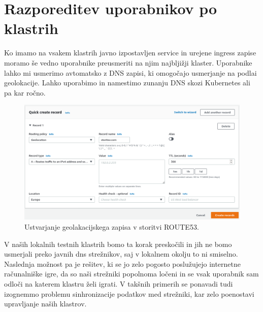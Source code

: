 \documentclass[a4paper, 12pt]{book}
\begin{document}
\section{Razporeditev uporabnikov po klastrih}
Ko imamo na vsakem klastrih javno izpostavljen service in urejene ingress zapise moramo še vedno uporabnike preusmeriti na njim najbljižji klaster.
Uporabnike lahko mi usmerimo avtomatsko z DNS zapisi, ki omogočajo usmerjanje na podlai geolokacije.
Lahko uporabimo in namestimo zunanju DNS skozi Kubernetes ali pa kar ročno.
\begin{figure}[h]
\begin{center}
\includegraphics[width=1.0\textwidth]{images/geolokacijski-dns.png}
\end{center}
\caption{Ustvarjanje geolakacijskega zapisa v storitvi ROUTE53.}
\label{primer-uporabe-helm-predloge-argo-cd}
\end{figure}
V naših lokalnih testnih klastrih bomo ta korak preskočili in jih ne bomo usmerjali preko javnih dns strežnikov, saj v lokalnem okolju to ni smiselno.
Naslednja možnost pa je rešitev, ki se jo zelo pogosto poslužujejo internetne računalniške igre, da so naši strežniki popolnoma ločeni in se vsak uporabnik sam odloči na katerem klastru želi igrati.
V takšnih primerih se ponavadi tudi izognemmo problemu sinhronizacije podatkov med strežniki, kar zelo poenostavi upravljanje naših klastrov.
\end{document}
